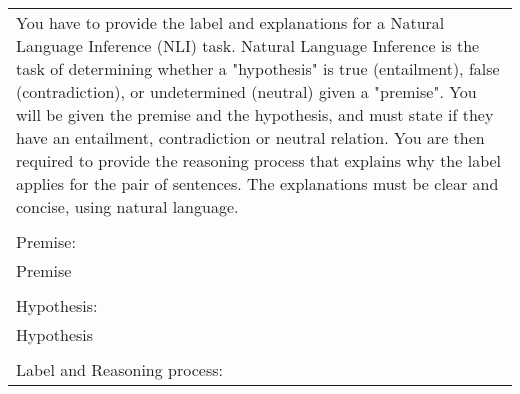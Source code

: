\begin{tabular}{p{8cm}}
\hline
You have to provide the label and explanations for a Natural Language Inference (NLI) task. Natural Language Inference is the task of determining whether a "hypothesis" is true (entailment), false (contradiction), or undetermined (neutral) given a "premise".
You will be given the premise and the hypothesis, and must state if they have an entailment, contradiction or neutral relation. You are then required to provide the reasoning process that explains why the label applies for the pair of sentences.
The explanations must be clear and concise, using natural language.   \\ \\
Premise: \\
{Premise} \\ \\
Hypothesis:\\
{Hypothesis} \\ \\
Label and Reasoning process:\\

\hline
\end{tabular}